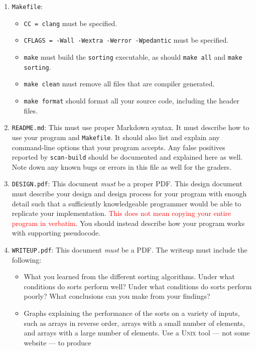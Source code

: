 \begin{enumerate}
  \item \texttt{Makefile}:
    \begin{itemize}
      \item \texttt{CC = clang} must be specified.
      \item \texttt{CFLAGS = -Wall -Wextra -Werror -Wpedantic} must be specified.
      \item \texttt{make} must build the \texttt{sorting}
        executable, as should \texttt{make all} and \texttt{make
        sorting}.
      \item \texttt{make clean} must remove all files that are compiler
        generated.
      \item \texttt{make format} should format all your source code,
        including the header files.
    \end{itemize}
  \item \texttt{README.md}: This must use proper Markdown syntax. It
    must describe how to use your program and \texttt{Makefile}. It
    should also list and explain any command-line options that your
    program accepts. Any false positives reported by \texttt{scan-build}
    should be documented and explained here as well. Note down any known
    bugs or errors in this file as well for the graders.
  \item \texttt{DESIGN.pdf}: This document \emph{must} be a proper
    PDF\@. This design document must describe your design and design
    process for your program with enough detail such that a sufficiently
    knowledgeable programmer would be able to replicate your
    implementation. \textcolor{red}{This does not mean copying your
    entire program in verbatim}. You should instead describe how your
    program works with supporting pseudocode.
  \item \texttt{WRITEUP.pdf}: This document \emph{must} be a PDF. The
    writeup must include the following:
    \begin{itemize}
      \item What you learned from the different sorting algorithms.
        Under what conditions do sorts perform well? Under what
        conditions do sorts perform poorly? What conclusions can you
        make from your findings?
      \item Graphs explaining the performance of the sorts on a variety
        of inputs, such as arrays in reverse order, arrays with a small
        number of elements, and arrays with a large number of elements.
        Use a \textsc{Unix} tool --- not some website --- to produce

\end{itemize}
\end{enumerate}
